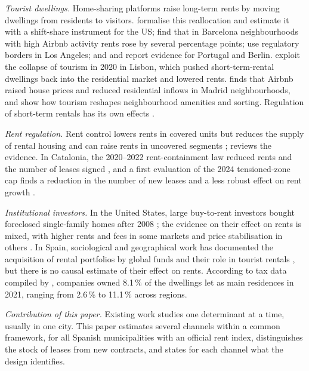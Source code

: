 \textit{Tourist dwellings.} Home-sharing platforms raise long-term rents by moving dwellings from residents to visitors. \citet{barron2021} formalise this reallocation and estimate it with a shift-share instrument for the US; \citet{garcialopez2020} find that in Barcelona neighbourhoods with high Airbnb activity rents rose by several percentage points; \citet{koster2021} use regulatory borders in Los Angeles; and \citet{franco2021} and \citet{duso2024} report evidence for Portugal and Berlin. \citet{batalha2022} exploit the collapse of tourism in 2020 in Lisbon, which pushed short-term-rental dwellings back into the residential market and lowered rents. \citet{chaves2026} finds that Airbnb raised house prices and reduced residential inflows in Madrid neighbourhoods, and \citet{almagro2025} show how tourism reshapes neighbourhood amenities and sorting. Regulation of short-term rentals has its own effects \citep{valentin2021}.

\textit{Rent regulation.} Rent control lowers rents in covered units but reduces the supply of rental housing and can raise rents in uncovered segments \citep{autor2014,diamond2019}; \citet{kholodilin2024} reviews the evidence. In Catalonia, the 2020--2022 rent-containment law reduced rents and the number of leases signed \citep{jofre2023,monras2023}, and a first evaluation of the 2024 tensioned-zone cap finds a reduction in the number of new leases and a less robust effect on rent growth \citep{perez2026}.

\textit{Institutional investors.} In the United States, large buy-to-rent investors bought foreclosed single-family homes after 2008 \citep{mills2019}; the evidence on their effect on rents is mixed, with higher rents and fees in some markets \citep{gurun2023} and price stabilisation in others \citep{garriga2023}. In Spain, sociological and geographical work has documented the acquisition of rental portfolios by global funds and their role in tourist rentals \citep{janoschka2020,cocola2025}, but there is no causal estimate of their effect on rents. According to tax data compiled by \citet{khametshin2024}, companies owned 8.1\,\% of the dwellings let as main residences in 2021, ranging from 2.6\,\% to 11.1\,\% across regions.

\textit{Contribution of this paper.} Existing work studies one determinant at a time, usually in one city. This paper estimates several channels within a common framework, for all Spanish municipalities with an official rent index, distinguishes the stock of leases from new contracts, and states for each channel what the design identifies.
